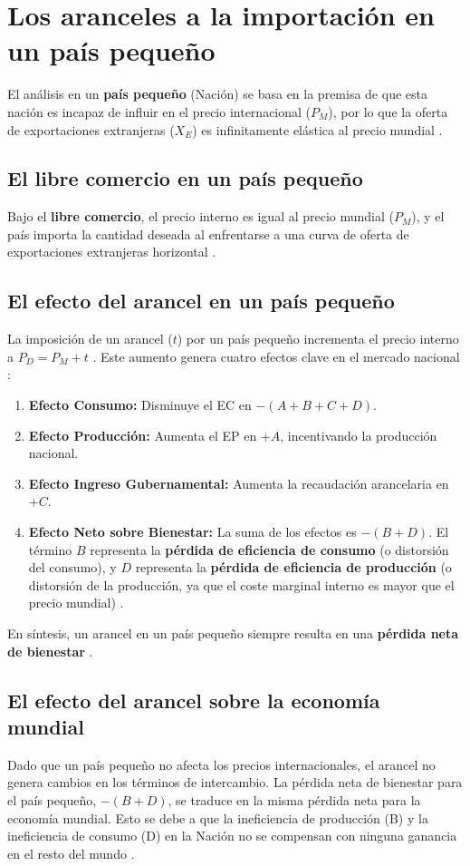\section{Los aranceles a la importación en un país pequeño}
El análisis en un \textbf{país pequeño} (Nación) se basa en la premisa de que esta nación es incapaz de influir en el precio internacional ($P_M$), por lo que la oferta de exportaciones extranjeras ($X_E$) es infinitamente elástica al precio mundial .

\subsection{El libre comercio en un país pequeño}
Bajo el \textbf{libre comercio}, el precio interno es igual al precio mundial ($P_M$), y el país importa la cantidad deseada al enfrentarse a una curva de oferta de exportaciones extranjeras horizontal .

\subsection{El efecto del arancel en un país pequeño}
La imposición de un arancel ($t$) por un país pequeño incrementa el precio interno a $P_D = P_M + t$ . Este aumento genera cuatro efectos clave en el mercado nacional :
\begin{enumerate}
    \item \textbf{Efecto Consumo:} Disminuye el EC en $-(A+B+C+D)$.
    \item \textbf{Efecto Producción:} Aumenta el EP en $+A$, incentivando la producción nacional.
    \item \textbf{Efecto Ingreso Gubernamental:} Aumenta la recaudación arancelaria en $+C$.
    \item \textbf{Efecto Neto sobre Bienestar:} La suma de los efectos es $-(B+D)$. El término $B$ representa la \textbf{pérdida de eficiencia de consumo} (o distorsión del consumo), y $D$ representa la \textbf{pérdida de eficiencia de producción} (o distorsión de la producción, ya que el coste marginal interno es mayor que el precio mundial) .
\end{enumerate}
En síntesis, un arancel en un país pequeño siempre resulta en una \textbf{pérdida neta de bienestar} .

\subsection{El efecto del arancel sobre la economía mundial}
Dado que un país pequeño no afecta los precios internacionales, el arancel no genera cambios en los términos de intercambio. La pérdida neta de bienestar para el país pequeño, $-(B+D)$, se traduce en la misma pérdida neta para la economía mundial. Esto se debe a que la ineficiencia de producción (B) y la ineficiencia de consumo (D) en la Nación no se compensan con ninguna ganancia en el resto del mundo .


